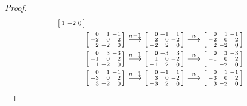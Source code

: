 \documentclass{amsart}
\theoremstyle{definition}
\theoremstyle{remark}
\numberwithin{equation}{section}
\newcommand{\0}{{\mathbf{0}}}
\begin{document}
\begin{proof}
\begin{align*}
\begin{bsmallmatrix*}[r]
	1 & -2 & 0
\end{bsmallmatrix*}\\
&\begin{bsmallmatrix*}[r]
	0 & 1 & -1 \\
	-2 & 0 & 2 \\
	2 & -2 & 0
\end{bsmallmatrix*}\overset{n-1}{\longrightarrow}
\begin{bsmallmatrix*}[r]
	0 & -1 & 1 \\
	2 & 0 & -2 \\
	-2 & 2 & 0
\end{bsmallmatrix*}\overset{n}{\longrightarrow}
\begin{bsmallmatrix*}[r]
	0 & 1 & -1 \\
	-2 & 0 & 2 \\
	2 & -2 & 0
\end{bsmallmatrix*}\\
&\begin{bsmallmatrix*}[r]
	0 & 3 & -3 \\
	-1 & 0 & 2 \\
	1 & -2 & 0
\end{bsmallmatrix*}\overset{n-1}{\longrightarrow}
\begin{bsmallmatrix*}[r]
	0 & -3 & 3 \\
	1 & 0 & -2 \\
	-1 & 2 & 0
\end{bsmallmatrix*}\overset{n}{\longrightarrow}
\begin{bsmallmatrix*}[r]
	0 & 3 & -3 \\
	-1 & 0 & 2 \\
	1 & -2 & 0
\end{bsmallmatrix*}\\
&\begin{bsmallmatrix*}[r]
	0 & 1 & -1 \\
	-3 & 0 & 2 \\
	3 & -2 & 0
\end{bsmallmatrix*}\overset{n-1}{\longrightarrow}
\begin{bsmallmatrix*}[r]
	0 & -1 & 1 \\
	3 & 0 & -2 \\
	-3 & 2 & 0
\end{bsmallmatrix*}\overset{n}{\longrightarrow}
\begin{bsmallmatrix*}[r]
	0 & 1 & -1 \\
	-3 & 0 & 2 \\
	3 & -2 & 0
\end{bsmallmatrix*}\\ 

\end{align*}
\end{proof}
\end{document}
